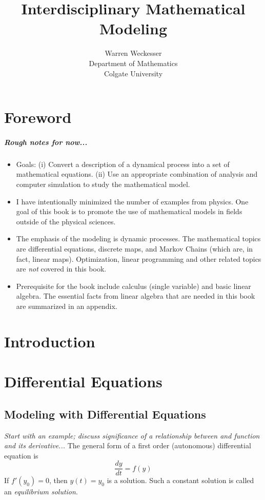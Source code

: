 \documentclass[reqno]{immbook}
\title{\textbf{Interdisciplinary Mathematical Modeling}}
\author{Warren Weckesser\\
Department of Mathematics\\
Colgate University}
\begin{document}
\frontmatter
\maketitle
\tableofcontents
%
%
%

\chapter*{Foreword}
\paragraph{Rough notes for now...}
\begin{itemize}
\item Goals: (i) Convert a description of a dynamical process
into a set of mathematical equations.
(ii) Use an appropriate combination of analysis and computer
simulation to study the mathematical model.
\item  I have intentionally minimized the
number of examples from physics.
One goal of this book is
to promote the use of mathematical models in fields outside of the
physical sciences.
\item The emphasis of the modeling is dynamic processes.
The mathematical topics are differential equations, discrete maps,
and Markov Chains (which are, in fact, linear maps).
Optimization, linear programming and other related topics
are \emph{not} covered in this book.
\item Prerequisite for the book include calculus (single variable)
and basic linear algebra.  The essential facts from linear algebra that
are needed in this book are summarized in an appendix.
\end{itemize}
%
\mainmatter
%
%
%

\chapter{Introduction}
%
%
%

\chapter{Differential Equations}

\section{Modeling with Differential Equations}
\emph{Start with an example; discuss significance of a
relationship between and function and its derivative...}
%
The general form of a first order (autonomous) differential
equation is
\[
   \frac{dy}{dt} = f(y)
\]
\noindent
If  $f'(y_{0})=0$, then $y(t)=y_{0}$ is a solution.  Such a constant
solution is called an \emph{equilibrium solution}.
\end{document}
